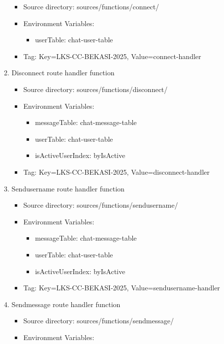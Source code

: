 \documentclass{article}
\begin{document}
\begin{enumerate}
\begin{enumerate}
    \begin{itemize}
      \item Source directory: sources/functions/connect/
      \item Environment Variables:
      \begin{itemize}
        \item userTable: chat-user-table
      \end{itemize}
      \item Tag: Key=LKS-CC-BEKASI-2025, Value=connect-handler
    \end{itemize}
    \item Disconnect route handler function
    \begin{itemize}
      \item Source directory: sources/functions/disconnect/ 
      \item Environment Variables:
      \begin{itemize}
        \item messageTable: chat-message-table
        \item userTable: chat-user-table
        \item isActiveUserIndex: byIsActive
      \end{itemize}
      \item Tag: Key=LKS-CC-BEKASI-2025, Value=disconnect-handler
    \end{itemize}
    \item Sendusername route handler function
    \begin{itemize}
      \item Source directory: sources/functions/sendusername/
      \item Environment Variables:
      \begin{itemize}
        \item messageTable: chat-message-table
        \item userTable: chat-user-table
        \item isActiveUserIndex: byIsActive
      \end{itemize}
      \item Tag: Key=LKS-CC-BEKASI-2025, Value=sendusername-handler
    \end{itemize}
    \item Sendmessage route handler function
    \begin{itemize}
      \item Source directory: sources/functions/sendmessage/
      \item Environment Variables:

\end{itemize}
\end{enumerate}
\end{enumerate}
\end{document}
